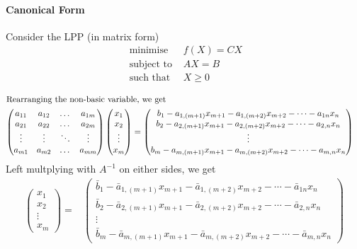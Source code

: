 \paragraph{Canonical Form}
	Consider the LPP (in matrix form)
\begin{align*}
\text{ minimise } & f(X) = CX \\
\text{ subject to } & AX = B \\
\text{ such that } & X \ge 0  
\end{align*}
\begin{commentary}
\begin{align*}
	\intertext{Rearranging the non-basic variable, we get}
	\begin{pmatrix} a_{11} & a_{12} & \dots & a_{1m} \\ a_{21} & a_{22} & \dots & a_{2m} \\ \vdots & \vdots & \ddots & \vdots \\ a_{m1} & a_{m2} & \dots & a_{mm} \end{pmatrix} \begin{pmatrix} x_1 \\ x_2 \\ \vdots \\ x_m \end{pmatrix} & = \begin{pmatrix} b_1 - a_{1,(m+1)} x_{m+1} - a_{1,(m+2)} x_{m+2} - \dotsb - a_{1n}x_n \\ b_2 - a_{2,(m+1)} x_{m+1} - a_{2,(m+2)} x_{m+2} - \dotsb - a_{2,n}x_n \\ \vdots \\ b_m-a_{m,(m+1)}x_{m+1} - a_{m,(m+2)}x_{m+2}-\dotsb-a_{m,n}x_n \end{pmatrix}
\end{align*}
Left multplying with $A^{-1}$ on either sides, we get
\begin{align*}
	\begin{pmatrix} x_1 \\ x_2 \\ \vdots \\ x_m \end{pmatrix} = & \begin{pmatrix} \bar{b}_1 - \bar{a}_{1,(m+1)} x_{m+1} - \bar{a}_{1,(m+2)} x_{m+2} - \dotsb - \bar{a}_{1n}x_n \\ \bar{b}_2 - \bar{a}_{2,(m+1)} x_{m+1} - \bar{a}_{2,(m+2)} x_{m+2} - \dotsb - \bar{a}_{2,n}x_n \\ \vdots \\ \bar{b}_m-\bar{a}_{m,(m+1)}x_{m+1} - \bar{a}_{m,(m+2)}x_{m+2}-\dotsb-\bar{a}_{m,n}x_n \end{pmatrix}\\

\end{align*}
\end{commentary}
